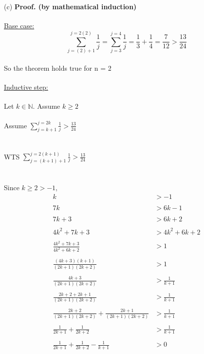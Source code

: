 \documentclass{article}
\newcommand{\N}{\mathbb{N}}
\begin{document}
\begin{enumerate}
	(c)  \textbf{Proof. (by mathematical induction)} \\\\
	\underline{Base case:} \\
	$${\displaystyle \sum_{j = (2) + 1}^{j = 2(2)} \frac{1}{j}}= {\displaystyle \sum_{j = 3}^{j = 4} \frac{1}{j}}
	= \frac{1}{3} + \frac{1}{4}=\frac{7}{12}> \frac{13}{24}$$\\
	So the theorem holds true for n = 2\\\\
	\underline{Inductive step:}\\\\
	Let $k\in \N$. Assume $k \geq 2$\\\\
	Assume ${\displaystyle \sum_{j = k + 1}^{j = 2k} \frac{1}{j}}>\displaystyle \frac{13}{24}$\\\\\\
	WTS $\displaystyle{\sum_{j = (k + 1)+1}^{j = 2(k+1)} \frac{1}{j} > \frac{13}{24}}$\\\\\\
	Since $k \geq 2 > -1$,\\
	\begin{align*}
	k &> -1\\\\
	7k &> 6k -1\\\\
	7k + 3 &> 6k + 2\\\\
	4k^2+ 7k + 3 &> 4k^2 + 6k + 2\\\\
	\frac{4k^2 + 7k + 3}{4k^2 + 6k + 2} &> 1\\\\
	\frac{(4k+3)(k+1)}{(2k+1)(2k+2)} &> 1\\\\
	\frac{4k+3}{(2k+1)(2k+2)} &> \frac{1}{k+1}\\\\
	\frac{2k+2+2k+1}{(2k+1)(2k+2)} &> \frac{1}{k+1}\\\\
	\frac{2k+2}{(2k+1)(2k+2)} + \frac{2k+1}{(2k+1)(2k+2)} &> \frac{1}{k+1}\\\\
	\frac{1}{2k+1}+\frac{1}{2k + 2} &>\frac{1}{k+1} \\\\
	\frac{1}{2k+1}+\frac{1}{2k + 2} - \frac{1}{k+1} &> 0 \\\\

\end{align*}
\end{enumerate}
\end{document}
